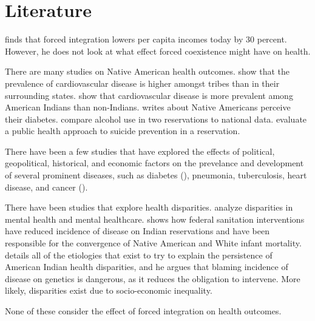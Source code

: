 \documentclass[12pt]{article}
\begin{document}
\section{Literature}
\cite{dippel2010forced} finds that forced integration lowers per capita incomes today by 30 percent. However, he does not look at what effect forced coexistence might have on health.

There are many studies on Native American health outcomes. 
\cite{levin2002geographic} show that the prevalence of cardiovascular disease is higher amongst tribes than in their surrounding states.
\cite{harwell2001cardiovascular} show that cardiovascular disease is more prevalent among American Indians than non-Indians.
\cite{patel2013health} writes about Native Americans perceive their diabetes.
\cite{beals2003racial} compare alcohol use in two reservations to national data.
\cite{may2005outcome} evaluate a public health approach to suicide prevention in a reservation.

There have been a few studies that have explored the effects of political, geopolitical, historical, and economic factors on the prevelance and development of several prominent diseases, such as diabetes (\cite{patchell2014role}), pneumonia, tuberculosis, heart disease, and cancer (\cite{heiner2014demographic}).

There have been studies that explore health disparities.
\cite{mcguire2008new} analyze disparities in mental health and mental healthcare.
\cite{watson2006public} shows how federal sanitation interventions have reduced incidence of disease on Indian reservations and have been responsible for the convergence of Native American and White infant mortality.
\cite{jones2006persistence} details all of the etiologies that exist to try to explain the persistence of American Indian health disparities, and he argues that blaming incidence of disease on genetics is dangerous, as it reduces the obligation to intervene. More likely, disparities exist due to socio-economic inequality.

None of these consider the effect of forced integration on health outcomes.
\end{document}

